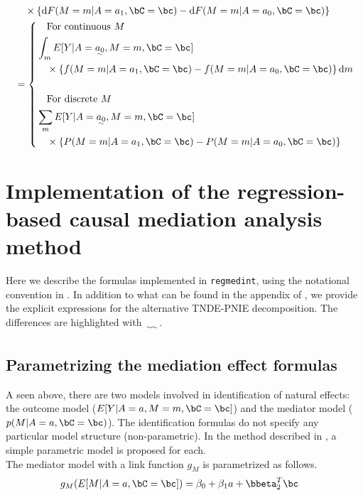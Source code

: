 \documentclass[10pt]{article}
\begin{document}
\begin{align*}
  &~~~ \times \left\{ \mathrm{d}F(M = m | A = a_{1}, \bC = \bc) - \mathrm{d}F(M = m | A = a_{0}, \bC = \bc) \right\}\\
  &= \left\{
  \begin{aligned}
  &~~~\text{For continuous }M\\
  &\int_{m} E[Y | A = \uwave{a_{0}}, M = m, \bC = \bc]\\
  &~~~ \times \left\{ f(M = m | A = a_{1}, \bC = \bc) - f(M = m | A = a_{0}, \bC = \bc) \right\} \mathrm{d}m\\
  &\\
  &~~~\text{For discrete }M\\
  &\sum_{m} E[Y | A = \uwave{a_{0}}, M = m, \bC = \bc]\\
  &~~~ \times \left\{ P(M = m | A = a_{1}, \bC = \bc) - P(M = m | A = a_{0}, \bC = \bc) \right\}\\
  \end{aligned}
\right .\\
\end{align*}


\section{Implementation of the regression-based causal mediation analysis method}
\label{sec:org5567ee9}
Here we describe the formulas implemented in \texttt{regmedint}, using the notational convention in \cite{vanderweeleExplanationCausalInference2015,valeriMediationAnalysisAllowing2013,valeriSASMacroCausal2015}. In addition to what can be found in the appendix of \cite{vanderweeleExplanationCausalInference2015}, we provide the explicit expressions for the alternative TNDE-PNIE decomposition. The differences are highlighted with \(\uwave{~~~~}\).

\subsection{Parametrizing the mediation effect formulas}
\label{sec:orgf36c752}
A seen above, there are two models involved in identification of natural effects: the outcome model (\(E[Y|A=a,M=m,\bC=\bc]\)) and the mediator model (\(p(M|A=a,\bC=\bc)\)). The identification formulas do not specify any particular model structure (non-parametric). In the method described in \cite{valeriMediationAnalysisAllowing2013,valeriSASMacroCausal2015}, a simple parametric model is proposed for each.\\

The mediator model with a link function \(g_{M}\) is parametrized as follows.
\begin{align*}
  g_{M}(E[M|A=a,\bC=\bc]) &= \beta_{0} + \beta_{1}a + \bbeta_{2}^{T}\bc
\end{align*}
\end{document}
